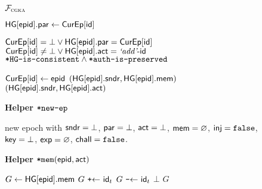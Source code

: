 \begin{figure*}[!tbp]
\begin{systembox}{\normalsize$\mathcal{F}_{\normalfont\textsc{cgka}}$}
{\begin{minipage}[t]{0.52\linewidth}
\begin{algorithmic}
      \State {}
         $\mathsf{HG}[{\normalfont\textsf{epid}}].\mathsf{par}\gets\textsf{CurEp}[{\mathsf{id}}]$
      \EndIf

      \State \KwAss{} $\textsf{CurEp}[{\mathsf{id}}]=\bot \lor \mathsf{HG}[{\normalfont\textsf{epid}}].\mathsf{par} = \textsf{CurEp}[{\mathsf{id}}]$
      \State \KwAss{} $\textsf{CurEp}[{\mathsf{id}}]\neq\bot \lor \mathsf{HG}[{\normalfont\textsf{epid}}].\mathsf{act} = {\text{\normalfont \it`add'}}\textrm{-}{\ensuremath{\mathsf{id}}}$
      \State {}
  		\State \KwAss{} ${\textnormal{\tt*HG-is-consistent}} \land {\ensuremath{\textnormal{\tt*auth-is-preserved}}}$


      \State {}
      \State $\textsf{CurEp}[{\mathsf{id}}] \gets {\normalfont\textsf{epid}}$
         \Return $(\mathsf{HG}[{\normalfont\textsf{epid}}].\mathsf{sndr},\mathsf{HG}[{\normalfont\textsf{epid}}].\mathsf{mem})$
      \Else
        \ \Return $(\mathsf{HG}[{\normalfont\textsf{epid}}].\mathsf{sndr},\mathsf{HG}[{\normalfont\textsf{epid}}].\mathsf{act})$
      \EndIf
    \end{algorithmic}

  \end{minipage}}

\hrulefill

     {\begin{minipage}[t]{0.47\linewidth}

    {\bf Helper ${\textnormal{\tt*new-ep}}$}
    \begin{algorithmic}
      \State \Return new epoch with $\mathsf{sndr}=\bot$, $\mathsf{par}=\bot$, $\mathsf{act}=\bot$, $\mathsf{mem}=\varnothing$, $\textsf{inj}={\normalfont\texttt{false}}$, $\mathsf{key}=\bot$, $\mathsf{exp}=\varnothing$, $\mathsf{chall}={\normalfont\texttt{false}}$.
    \end{algorithmic}

    \medskip
    {\bf Helper ${\textnormal{\tt*mem}}({\normalfont\textsf{epid}},\mathsf{act})$}
    \begin{algorithmic}
      \State $G \gets \mathsf{HG}[{\normalfont\textsf{epid}}].\mathsf{mem} $
        \State $G \ \texttt{+$\gets$}\  {\mathsf{id}}_t$
        \State $G \ \texttt{-$\gets$}\  {\mathsf{id}}_t$
      \EndIf
        \State \Return $\bot$
      \EndIf
      \State \Return $G$
    \end{algorithmic}
  \end{minipage}}\hfill
  {\begin{minipage}[t]{0.49\linewidth}


\end{minipage}}
\end{systembox}
\end{figure*}

